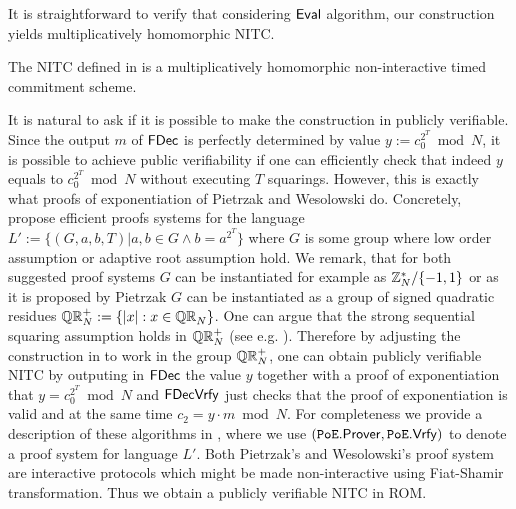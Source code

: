 It is straightforward to verify that considering $\mathsf{Eval}$ algorithm, our construction yields multiplicatively homomorphic NITC. 
\begin{theorem}\label{hom-mh}
The NITC \mathlist{(\pgen, \com, \cvrfy, \dvrfy, \fdecom, \fdvrfy, \eval)} defined in  is a multiplicatively homomorphic non-interactive timed commitment scheme.
\end{theorem}

\begin{remark}\label{rem:pv}
It is natural to ask if it is possible to make the construction in  publicly verifiable. Since the output $m$ of $\mathsf{FDec}$ is perfectly determined by value $y:= c_0^{2^T} \bmod N$, it is possible to achieve public verifiability if one can efficiently check that indeed $y$ equals to $c_0^{2^T} \bmod N$ without executing $T$ squarings. However, this is exactly what proofs of exponentiation of Pietrzak \cite{ITCS:Pietrzak19b} and Wesolowski \cite{EC:Wesolowski19} do. Concretely, \cite{ITCS:Pietrzak19b,EC:Wesolowski19} propose efficient proofs systems for the language $L':=\{(G,a,b,T)|a,b \in G \land b=a^{2^T}\}$ where $G$ is some group where low order assumption \cite{ITCS:Pietrzak19b} or adaptive root assumption \cite{EC:Wesolowski19} hold. We remark, that for both suggested proof systems $G$ can be instantiated for example as $\mathbb{Z}_N^*/ \{-1,1\}$ \cite{EC:Wesolowski19,EPRINT:BonBunFis18} or as it is proposed by Pietrzak $G$ can be instantiated as a group of signed quadratic residues $\mathbb{QR}_N^+:=\{|x|:x \in \mathbb{QR}_N\}$. One can argue that the strong sequential squaring assumption holds in $\mathbb{QR}_N^+$ (see e.g. \cite{ITCS:Pietrzak19b,EPRINT:EFKP20a}). Therefore by adjusting the construction in  to work in the group $\mathbb{QR}_N^+$, one can obtain publicly verifiable NITC by outputing in $\mathsf{FDec}$ the value $y$ together with a proof of exponentiation that $y=c_0^{2^T} \bmod N$ and $\mathsf{FDecVrfy}$ just checks that the proof of exponentiation is valid and at the same time $c_2 = y \cdot m \bmod N$. For completeness we provide a description of these algorithms in , where we use $(\mathtt{PoE}.\mathsf{Prover}, \mathtt{PoE}.\mathsf{Vrfy})$ to denote a proof system for language $L'$. Both Pietrzak's and Wesolowski's proof system are interactive protocols which might be made non-interactive using Fiat-Shamir transformation. Thus we obtain a publicly verifiable NITC in ROM.   
\end{remark}

